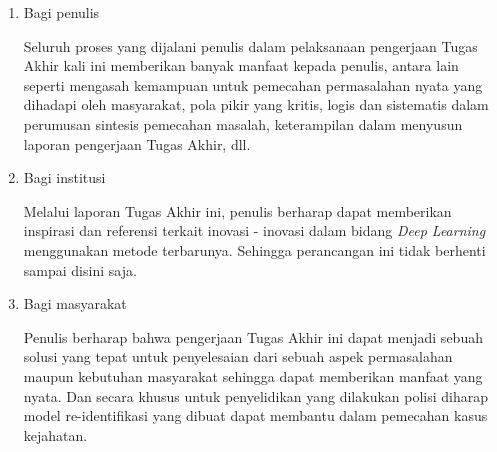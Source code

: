 \begin{enumerate}[nolistsep]
  
  \item Bagi penulis
  
  Seluruh proses yang dijalani penulis dalam pelaksanaan pengerjaan Tugas Akhir
  kali ini memberikan banyak manfaat kepada penulis, antara lain seperti mengasah
  kemampuan untuk pemecahan permasalahan nyata yang dihadapi oleh masyarakat,
  pola pikir yang kritis, logis dan sistematis dalam perumusan sintesis pemecahan
  masalah, keterampilan dalam menyusun laporan pengerjaan Tugas Akhir, dll.
  \item Bagi institusi
  
  Melalui laporan Tugas Akhir ini, penulis berharap dapat memberikan inspirasi dan
  referensi terkait inovasi - inovasi dalam bidang \emph{Deep Learning} menggunakan 
  metode terbarunya. Sehingga perancangan ini tidak berhenti sampai disini saja.
  \item Bagi masyarakat
  
  Penulis berharap bahwa pengerjaan Tugas Akhir ini dapat menjadi sebuah solusi yang 
  tepat untuk penyelesaian dari sebuah aspek permasalahan
  maupun kebutuhan masyarakat sehingga dapat memberikan manfaat yang nyata.
  Dan secara khusus untuk penyelidikan yang dilakukan polisi diharap model re-identifikasi yang dibuat
  dapat membantu dalam pemecahan kasus kejahatan.
  
\end{enumerate}










